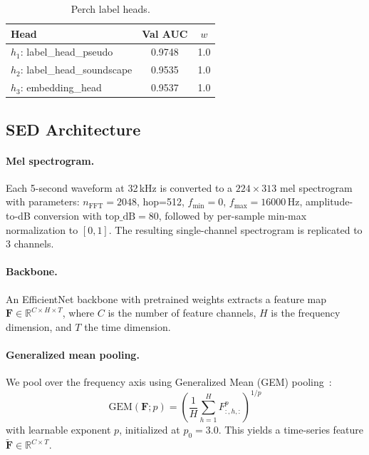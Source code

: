 \documentclass[10pt,twocolumn]{article}
\begin{document}
\begin{table}[h]
\centering
\small
\caption{Perch label heads.}
\label{tab:perch_heads}
\begin{tabular}{lcc}
\toprule
Head & Val AUC & $w$ \\
\midrule
$h_1$: label\_head\_pseudo     & 0.9748 & 1.0 \\
$h_2$: label\_head\_soundscape & 0.9535 & 1.0 \\
$h_3$: embedding\_head         & 0.9537 & 1.0 \\
\bottomrule
\end{tabular}
\end{table}

\subsection{SED Architecture}
\label{sec:sed_arch}

\paragraph{Mel spectrogram.}
Each 5-second waveform at 32\,kHz is converted to a $224 \times 313$
mel spectrogram with parameters: $n_\text{FFT}=2048$, hop=512,
$f_\text{min}=0$, $f_\text{max}=16000$\,Hz, amplitude-to-dB conversion with
$\text{top\_dB}=80$, followed by per-sample min-max normalization to $[0,1]$.
The resulting single-channel spectrogram is replicated to 3 channels.

\paragraph{Backbone.}
An EfficientNet backbone with pretrained weights extracts a feature map
$\mathbf{F} \in \mathbb{R}^{C \times H \times T}$, where $C$ is the number
of feature channels, $H$ is the frequency dimension, and $T$ the time dimension.

\paragraph{Generalized mean pooling.}
We pool over the frequency axis using Generalized Mean (GEM) pooling~\cite{radenovic2018gem}:
\begin{equation}
  \text{GEM}(\mathbf{F}; p) = \left(\frac{1}{H}\sum_{h=1}^{H} F_{:,h,:}^{p}\right)^{1/p}
  \label{eq:gem}
\end{equation}
with learnable exponent $p$, initialized at $p_0=3.0$.
This yields a time-series feature $\tilde{\mathbf{F}} \in \mathbb{R}^{C \times T}$.
\end{document}

